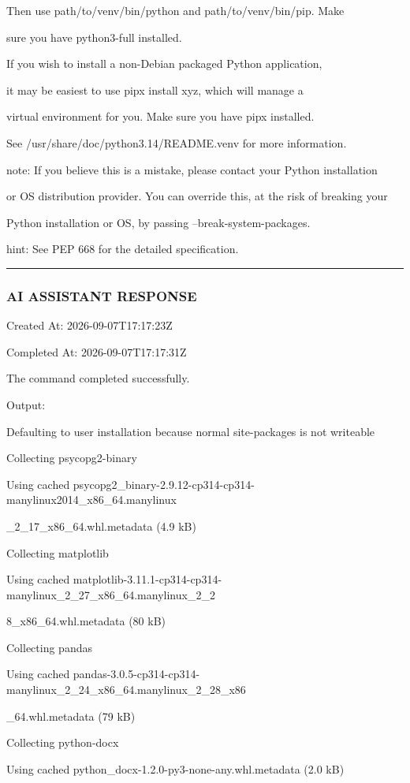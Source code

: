 \documentclass[11pt,a4paper]{article}
\begin{document}
Then use path/to/venv/bin/python and path/to/venv/bin/pip. Make

sure you have python3-full installed.


If you wish to install a non-Debian packaged Python application,

it may be easiest to use pipx install xyz, which will manage a

virtual environment for you. Make sure you have pipx installed.


See /usr/share/doc/python3.14/README.venv for more information.


note: If you believe this is a mistake, please contact your Python installation

or OS distribution provider. You can override this, at the risk of breaking your

Python installation or OS, by passing --break-system-packages.

hint: See PEP 668 for the detailed specification.


\hrule

\subsubsection{AI ASSISTANT RESPONSE}

Created At: 2026-09-07T17:17:23Z

Completed At: 2026-09-07T17:17:31Z


The command completed successfully.

Output:

Defaulting to user installation because normal site-packages is not writeable

Collecting psycopg2-binary

Using cached psycopg2\_binary-2.9.12-cp314-cp314-manylinux2014\_x86\_64.manylinux

\_2\_17\_x86\_64.whl.metadata (4.9 kB)

Collecting matplotlib

Using cached matplotlib-3.11.1-cp314-cp314-manylinux\_2\_27\_x86\_64.manylinux\_2\_2

8\_x86\_64.whl.metadata (80 kB)

Collecting pandas

Using cached pandas-3.0.5-cp314-cp314-manylinux\_2\_24\_x86\_64.manylinux\_2\_28\_x86

\_64.whl.metadata (79 kB)

Collecting python-docx

Using cached python\_docx-1.2.0-py3-none-any.whl.metadata (2.0 kB)
\end{document}
